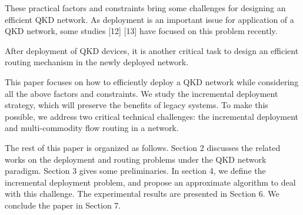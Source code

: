 These practical factors and constraints bring some challenges for designing an efficient QKD network. As deployment is an important issue for application of a QKD network, some studies [12] [13] have focused on this problem recently. 


After deployment of QKD devices, it is another critical task to design an efficient routing mechanism in the newly deployed network.


This paper focuses on how to efficiently deploy a QKD network while considering all the above factors and constraints. We study the incremental deployment strategy, which will preserve the benefits of legacy systems. To make this possible, we address two critical technical challenges: the incremental deployment and multi-commodity flow routing in a network.


The rest of this paper is organized as follows. Section 2 discusses the related works on the deployment and routing problems under the QKD network paradigm. Section 3 gives some preliminaries. In section 4, we define the incremental deployment problem, and propose an approximate algorithm to deal with this challenge. The experimental results are presented in Section 6. We conclude the paper in Section 7.
